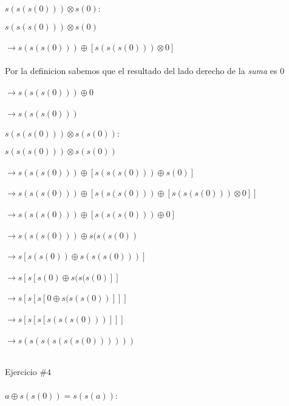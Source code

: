 \documentclass[]{article}
\begin{document}
$s(s(s(0))) \otimes s(0)$:\\
\begin{center}
$s(s(s(0))) \otimes s(0)$\\~\\
$\rightarrow s(s(s(0))) \oplus [s(s(s(0))) \otimes 0]$\\~\\
Por la definicion sabemos que el resultado del lado derecho de la \emph{suma} es $0$\\~\\
$\rightarrow s(s(s(0))) \oplus 0$\\~\\
$\rightarrow s(s(s(0)))$
\end{center}
\newpage
$s(s(s(0))) \otimes s(s(0))$:\\
\begin{center}
$s(s(s(0))) \otimes s(s(0))$\\~\\
$\rightarrow s(s(s(0))) \oplus [s(s(s(0))) \oplus s(0)]$\\~\\
$\rightarrow s(s(s(0))) \oplus [s(s(s(0))) \oplus [s(s(s(0))) \otimes 0]]$\\~\\
$\rightarrow s(s(s(0))) \oplus [s(s(s(0))) \oplus 0]$\\~\\
$\rightarrow s(s(s(0))) \oplus s(s(s(0))$\\~\\
$\rightarrow s[s(s(0)) \oplus s(s(s(0)))]$\\~\\
$\rightarrow s[s[s(0) \oplus s(s(s(0)]]$\\~\\
$\rightarrow s[s[s[0 \oplus s(s(s(0))]]]$\\~\\
$\rightarrow s[s[s[s(s(s(0)))]]]$\\~\\
$\rightarrow s(s(s(s(s(s(0))))))$\\~\\
\end{center}
\Large
Ejercicio $\# 4$\\~\\
\normalsize
$a \oplus s(s(0)) = s(s(a))$:\\
\end{document}
